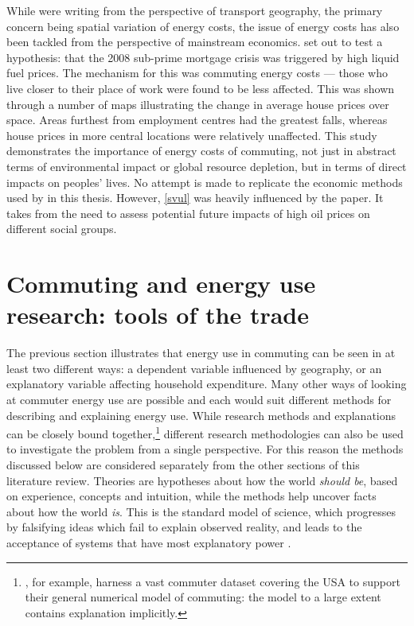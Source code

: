 \documentclass[a4paper, 11pt, twoside]{Thesis}
\begin{document}
While \citet{Boussauw2009} were writing from the perspective of transport
geography, the primary concern being spatial variation of energy costs,
the issue of energy costs has also been tackled from the perspective of
mainstream economics. \citet{Sexton2011} set out to
test a hypothesis: that the 2008 sub-prime mortgage crisis was triggered
by high liquid fuel prices. The mechanism for this was commuting energy costs ---
those who live closer to their place of work were found to be less affected.
This was shown through a number of maps illustrating the change in average
house prices over space. Areas furthest from employment centres had the greatest
falls, whereas house prices in more central locations were relatively unaffected.
This study demonstrates the importance of energy costs of commuting,
not just in abstract terms of environmental impact or global resource depletion,
but in terms of direct impacts on peoples' lives. No attempt is made to
replicate the economic methods used by \citet{Sexton2011} in this thesis.
However, \cref{svul} was heavily influenced by the paper. It takes from
\citet{Sexton2011} the need to assess potential future impacts of high oil prices
on different social groups.

\section{Commuting and energy use research: tools of the trade}
\label{s:tools}
The previous section illustrates that energy use in commuting can be seen in 
at least two different ways: a dependent variable influenced by geography, or
an explanatory variable affecting household expenditure.
Many other ways of looking at commuter energy use are possible and each
would suit different methods for describing and explaining
energy use. While research methods
and explanations can be closely bound
together,\footnote{\citet{Simini2012}, for
example, harness a vast commuter dataset covering the USA to support their
general numerical model of commuting: the model to a large extent
contains explanation implicitly.
}
different research methodologies
can also be used to investigate the problem from a single perspective.
For this reason the methods discussed below
are considered separately from the other sections of this literature review.
Theories are hypotheses about how the world \emph{should be}, based on
experience, concepts and intuition, while
the methods help uncover facts about how the world \emph{is}. This is the
standard model of science, which progresses by falsifying ideas which fail to
explain observed reality, and leads to the acceptance of systems that have most
explanatory power \citep{Popper1959}.
\end{document}
